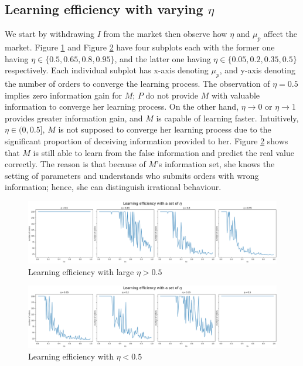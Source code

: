\documentclass{article}
\begin{document}
\subsection{Learning efficiency with varying $\eta$}
We start by withdrawing $I$ from the market then observe how $\eta$ and $\mu_p$ affect the market. Figure \ref{fig:large eta} and Figure \ref{fig:small eta} have four subplots each with the former one having $\eta \in \{0.5, 0.65, 0.8, 0.95\}$, and the latter one having $\eta \in \{0.05, 0.2, 0.35, 0.5\}$ respectively. Each individual subplot has x-axis denoting $\mu_p$, and y-axis denoting the number of orders to converge the learning process. The observation of $\eta = 0.5$ implies zero information gain for $M$; $P$ do not provide $M$ with valuable information to converge her learning process. On the other hand, $\eta \rightarrow 0$ or $\eta \rightarrow 1$ provides greater information gain, and $M$ is capable of learning faster. Intuitively, $\eta \in (0, 0.5]$, $M$ is not supposed to converge her learning process due to the significant proportion of deceiving information provided to her. Figure \ref{fig:small eta} shows that $M$ is still able to learn from the false information and predict the real value correctly. The reason is that because of $M$'s information set, she knows the setting of parameters and understands who submits orders with wrong information; hence, she can distinguish irrational behaviour.

\begin{figure}[H]
    \centering
    \includegraphics[width=\textwidth]{v3_fig1_large_eta.png}
    \caption{Learning efficiency with large $\eta > 0.5$}
    \label{fig:large eta}
\end{figure}

\begin{figure}[H]
    \centering
    \includegraphics[width=\textwidth]{v3_fig2_small_eta.png}
    \caption{Learning efficiency with $\eta < 0.5$}
    \label{fig:small eta}
\end{figure}
\end{document}
